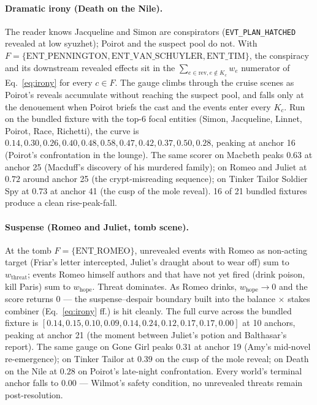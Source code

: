 \documentclass[11pt]{article}
\begin{document}
\paragraph{Dramatic irony (Death on the Nile).} The reader knows
Jacqueline and Simon are conspirators (\texttt{EVT\_PLAN\_HATCHED}
revealed at low syuzhet); Poirot and the suspect pool do not.
With $F = \{\text{ENT\_PENNINGTON}, \text{ENT\_VAN\_SCHUYLER},
\text{ENT\_TIM}\}$, the conspiracy and its downstream
revealed effects sit in the
$\sum_{e \in \mathrm{rev}, e \notin K_c} w_e$ numerator of
Eq.~\ref{eq:irony} for every $c \in F$. The gauge climbs through
the cruise scenes as Poirot's reveals accumulate without reaching
the suspect pool, and falls only at the denouement when Poirot
briefs the cast and the events enter every $K_c$. Run on the
bundled fixture with the top-6 focal entities (Simon, Jacqueline,
Linnet, Poirot, Race, Richetti), the curve is $0.14, 0.30, 0.26,
0.40, 0.48, \mathbf{0.58}, 0.47, 0.42, 0.37, 0.50, 0.28$, peaking
at anchor 16 (Poirot's confrontation in the lounge). The same
scorer on Macbeth peaks $0.63$ at anchor 25 (Macduff's
discovery of his murdered family); on Romeo and Juliet at $0.72$
around anchor 25 (the crypt-misreading sequence); on Tinker Tailor
Soldier Spy at $0.73$ at anchor 41 (the cusp of the mole reveal).
16 of 21 bundled fixtures produce a clean rise-peak-fall.

\paragraph{Suspense (Romeo and Juliet, tomb scene).} At the tomb
$F=\{\text{ENT\_ROMEO}\}$, unrevealed events with Romeo as
non-acting target (Friar's letter intercepted, Juliet's draught
about to wear off) sum to $w_\text{threat}$; events Romeo himself
authors and that have not yet fired (drink poison, kill Paris) sum
to $w_\text{hope}$. Threat dominates. As Romeo drinks, $w_\text{hope}
\to 0$ and the score returns $0$ --- the suspense--despair boundary
built into the balance$\,\times\,$stakes combiner (Eq.~\ref{eq:irony}
ff.) is hit cleanly. The full curve across the bundled fixture is
$[0.14, 0.15, 0.10, 0.09, 0.14, \mathbf{0.24}, 0.12, 0.17, 0.17,
0.00]$ at 10 anchors, peaking at anchor 21 (the moment between
Juliet's potion and Balthasar's report). The same gauge on Gone
Girl peaks $0.31$ at anchor 19 (Amy's mid-novel re-emergence); on
Tinker Tailor at $0.39$ on the cusp of the mole reveal; on Death
on the Nile at $0.28$ on Poirot's late-night confrontation.
Every world's terminal anchor falls to $0.00$ --- Wilmot's safety
condition, no unrevealed threats remain post-resolution.
\end{document}

